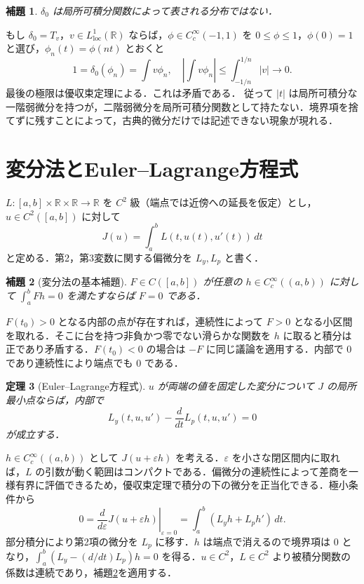 \documentclass[a5paper,10pt,onecolumn]{jsarticle}
\makeatletter
\theoremstyle{mathnotetheorem}
\newtheorem{theorem}{定理}[section]
\newtheorem{lemma}[theorem]{補題}
\renewcommand{\proofname}{証明}
\renewenvironment{proof}[1][\proofname]{%
  \par\pushQED{\qed}\normalfont\topsep4\p@\@plus2\p@\relax
  \trivlist\item[\hskip\labelsep\bfseries #1]\ignorespaces
}{\popQED\endtrivlist\@endpefalse}
\newcommand{\R}{\mathbb{R}}
\makeatother
\begin{document}
\begin{lemma}
$\delta_0$ は局所可積分関数によって表される分布ではない．
\end{lemma}
\begin{proof}
もし $\delta_0=T_v$，$v\in L^1_{\mathrm{loc}}(\R)$ ならば，$\phi\in C_c^\infty(-1,1)$ を $0\le\phi\le1$，$\phi(0)=1$ と選び，$\phi_n(t)=\phi(nt)$ とおくと
\[
 1=\delta_0(\phi_n)=\int v\phi_n,
 \quad \left|\int v\phi_n\right|\le\int_{-1/n}^{1/n}|v|\to0.
\]
最後の極限は優収束定理による．これは矛盾である．
\end{proof}
従って $|t|$ は局所可積分な一階弱微分を持つが，二階弱微分を局所可積分関数として持たない．境界項を捨てずに残すことによって，古典的微分だけでは記述できない現象が現れる．

\section{変分法とEuler--Lagrange方程式}
$L:[a,b]\times\R\times\R\to\R$ を $C^2$ 級（端点では近傍への延長を仮定）とし，$u\in C^2([a,b])$ に対して
\[
 J(u)=\int_a^b L(t,u(t),u'(t))\,dt
\]
と定める．第2，第3変数に関する偏微分を $L_y,L_p$ と書く．
\begin{lemma}[変分法の基本補題]\label{lem:fund}
$F\in C([a,b])$ が任意の $h\in C_c^\infty((a,b))$ に対して $\int_a^b Fh=0$ を満たすならば $F=0$ である．
\end{lemma}
\begin{proof}
$F(t_0)>0$ となる内部の点が存在すれば，連続性によって $F>0$ となる小区間を取れる．そこに台を持つ非負かつ零でない滑らかな関数を $h$ に取ると積分は正であり矛盾する．$F(t_0)<0$ の場合は $-F$ に同じ議論を適用する．内部で $0$ であり連続性により端点でも $0$ である．
\end{proof}
\begin{theorem}[Euler--Lagrange方程式]\label{thm:el}
$u$ が両端の値を固定した変分について $J$ の局所最小点ならば，内部で
\begin{equation}\label{eq:el}
 L_y(t,u,u')-\frac{d}{dt}L_p(t,u,u')=0
\end{equation}
が成立する．
\end{theorem}
\begin{proof}
$h\in C_c^\infty((a,b))$ として $J(u+\varepsilon h)$ を考える．$\varepsilon$ を小さな閉区間内に取れば，$L$ の引数が動く範囲はコンパクトである．偏微分の連続性によって差商を一様有界に評価できるため，優収束定理で積分の下の微分を正当化できる．極小条件から
\[
 0=\left.\frac{d}{d\varepsilon}J(u+\varepsilon h)\right|_{\varepsilon=0}
 =\int_a^b (L_y h+L_p h')\,dt.
\]
部分積分により第2項の微分を $L_p$ に移す．$h$ は端点で消えるので境界項は $0$ となり，$\int_a^b(L_y-(d/dt)L_p)h=0$ を得る．$u\in C^2$，$L\in C^2$ より被積分関数の係数は連続であり，補題\ref{lem:fund}を適用する．
\end{proof}
\end{document}
